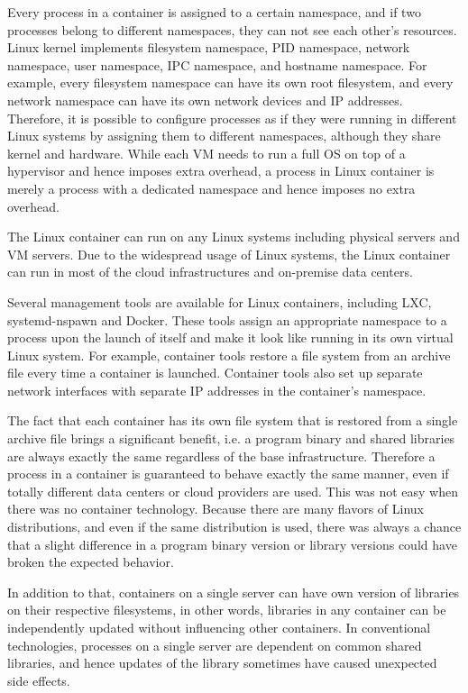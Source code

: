 Every process in a container is assigned to a certain namespace, and if two processes belong to different namespaces, they can not see each other's resources. 
Linux kernel implements filesystem namespace, PID namespace, network namespace, user namespace, IPC namespace, and hostname namespace. 
For example, every filesystem namespace can have its own root filesystem, and every network namespace can have its own network devices and IP addresses.
Therefore, it is possible to configure processes as if they were running in different Linux systems by assigning them to different namespaces, although they share kernel and hardware.
While each VM needs to run a full OS on top of a hypervisor and hence imposes extra overhead, a process in Linux container is merely a process with a dedicated namespace and hence imposes no extra overhead.

The Linux container can run on any Linux systems including physical servers and VM servers.
Due to the widespread usage of Linux systems, the Linux container can run in most of the cloud infrastructures and on-premise data centers.

Several management tools are available for Linux containers, including LXC\cite{noronha2018performance}, systemd-nspawn\cite{jedge2013} and Docker\cite{merkel2014docker}.
These tools assign an appropriate namespace to a process upon the launch of itself and make it look like running in its own virtual Linux system.
For example, container tools restore a file system from an archive file every time a container is launched. 
Container tools also set up separate network interfaces with separate IP addresses in the container's namespace.

The fact that each container has its own file system that is restored from a single archive file brings a significant benefit, i.e. a program binary and shared libraries are always exactly the same regardless of the base infrastructure.
Therefore a process in a container is guaranteed to behave exactly the same manner, even if totally different data centers or cloud providers are used.
This was not easy when there was no container technology.
Because there are many flavors of Linux distributions, and even if the same distribution is used, there was always a chance that a slight difference in a program binary version or library versions could have broken the expected behavior.

In addition to that, containers on a single server can have own version of libraries on their respective filesystems, in other words, libraries in any container can be independently updated without influencing other containers.
In conventional technologies, processes on a single server are dependent on common shared libraries, and hence updates of the library sometimes have caused unexpected side effects.

